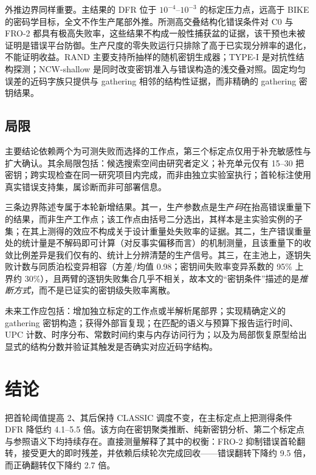 \documentclass[UTF8,a4paper,10pt,twocolumn]{ctexart}
\begin{document}
外推边界同样重要。主结果的 DFR 位于 $10^{-4}$--$10^{-3}$ 的标定压力点，远高于 BIKE 的密码学目标，全文不作生产尾部外推。所测高交叠结构化错误条件对 C0 与 FRO-2 都具有极高失败率，这些结果不构成一般性捕获盆的证据，该干预也未被证明是错误平台防御。生产尺度的零失败运行只排除了高于已实现分辨率的退化，不能证明收益。RAND 主要支持所抽样的随机密钥生成器；TYPE-I 是对抗性结构探测；NCW-shallow 是同时改变密钥准入与错误构造的浅交叠对照。固定均匀误差的近码字族只提供与 gathering 相邻的结构性证据，而非精确的 gathering 密钥结果。

\subsection{局限}

主要结论依赖两个为可测失败而选择的工作点，第三个标定点仅用于补充敏感性与扩大确认。其余局限包括：候选搜索空间由研究者定义；补充单元仅有 15--30 把密钥；跨实现检查在同一研究项目内完成，而非由独立实验室执行；首轮标注使用真实错误支持集，属诊断而非可部署信息。

三条边界陈述专属于本轮新增结果。其一，生产参数点是生产\emph{码}在抬高错误重量下的结果，而非生产工作点；该工作点由括号二分选出，其样本是主实验实例的子集；在其上测得的效应不构成关于设计重量处失败率的证据。其二，生产错误重量处的统计量是不解码即可计算（对反事实偏移而言）的机制测量，且该重量下的收敛比例差异是我们仅有的、统计上分辨清楚的生产信号。其三，在主池上，逐钥失败计数与同质泊松变异相容（方差/均值 0.98；密钥间失败率变异系数的 95\% 上界约 30\%），且两臂的逐钥失败集合几乎不相关，故本文的“密钥条件”描述的是\emph{推断方式}，而不是已证实的密钥级失败率离散。

未来工作应包括：增加独立标定的工作点或半解析尾部界；实现精确定义的 gathering 密钥构造；获得外部盲复现；在匹配的语义与预算下报告运行时间、UPC 计数、时序分布、常数时间约束与内存访问行为；以及为局部恢复原型给出显式的结构分数并验证其触发是否确实对应近码字结构。

\section{结论}\label{sec:conclusion}

把首轮阈值提高 2、其后保持 CLASSIC 调度不变，在主标定点上把测得条件 DFR 降低约 4.1--5.5 倍。该方向在密钥聚类推断、纯新密钥分析、第二个标定点与参照语义下均持续存在。直接测量解释了其中的权衡：FRO-2 抑制错误首轮翻转，接受更大的即时残差，并依赖后续轮次完成回收——错误翻转下降约 9.5 倍，而正确翻转仅下降约 2.7 倍。
\end{document}
